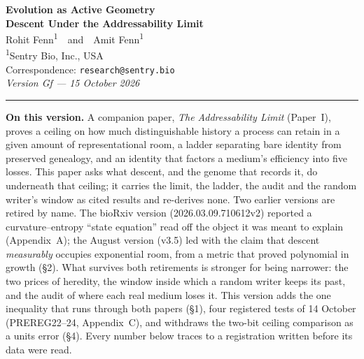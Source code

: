 \documentclass[11pt]{article}
\begin{document}
\thispagestyle{empty}

\begin{center}
{\LARGE\bfseries Evolution as Active Geometry}\\[4pt]
{\Large\bfseries Descent Under the Addressability Limit}\\[16pt]
{\large Rohit Fenn\textsuperscript{1}\ \ and\ \ Amit Fenn\textsuperscript{1}}\\[4pt]
{\small\textsuperscript{1}Sentry Bio, Inc., USA}\\[2pt]
{\small Correspondence: \texttt{research@sentry.bio}}\\[2pt]
{\small\itshape Version Gf --- 15 October 2026}
\end{center}

\vspace{6pt}\noindent\rule{\textwidth}{0.4pt}\vspace{4pt}

\footnotesize
\noindent\textbf{On this version.} A companion paper, \emph{The Addressability Limit} (Paper~I), proves a ceiling on how much distinguishable history a process can retain in a given amount of representational room, a ladder separating bare identity from preserved genealogy, and an identity that factors a medium's efficiency into five losses. This paper asks what descent, and the genome that records it, do underneath that ceiling; it carries the limit, the ladder, the audit and the random writer's window as cited results and re-derives none. Two earlier versions are retired by name. The bioRxiv version (2026.03.09.710612v2) reported a curvature--entropy ``state equation'' read off the object it was meant to explain (Appendix~A); the August version (v3.5) led with the claim that descent \emph{measurably} occupies exponential room, from a metric that proved polynomial in growth (\S2). What survives both retirements is stronger for being narrower: the two prices of heredity, the window inside which a random writer keeps its past, and the audit of where each real medium loses it. This version adds the one inequality that runs through both papers (\S1), four registered tests of 14 October (PREREG22--24, Appendix~C), and withdraws the two-bit ceiling comparison as a units error (\S4). Every number below traces to a registration written before its data were read.\normalsize
\end{document}
